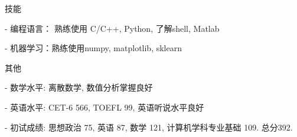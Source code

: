 \documentclass{resume} %
\begin{document}
\begin{rSection}{技能}
\begin{rSubsection}
{}{}{}{}
\item[-] 编程语言： 熟练使用 C/C++, Python, 了解shell, Matlab
\item[-] 机器学习：熟练使用numpy, matplotlib, sklearn
\end{rSubsection}
\end{rSection}


\begin{rSection}{其他}
\begin{rSubsection}
{}{}{}{}
\item[-] 数学水平: 离散数学, 数值分析掌握良好
\item[-] 英语水平: CET-6 566, TOEFL 99, 英语听说水平良好
\item[-] 初试成绩: 思想政治 75, 英语 87, 数学 121, 计算机学科专业基础 109. 总分392.
\end{rSubsection}
\end{rSection}
\end{document}
